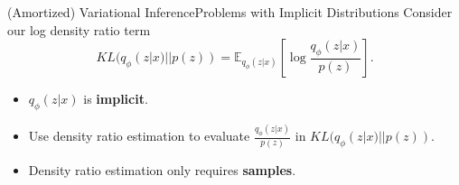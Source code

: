 \documentclass[handout]{beamer}
\newcommand{\E}{\mathbb{E}}
\begin{document}
\begin{frame}{(Amortized) Variational Inference}{Problems with Implicit Distributions}
Consider our log density ratio term
\[KL(q_\phi(z|x)||p(z))=\E_{q_\phi(z|x)}\left[\log \frac{q_\phi(z|x)}{p(z)}\right].\]
\begin{itemize}
\item $q_\phi(z|x)$ is \textbf{implicit}.
\vspace{0.2cm}
\item Use density ratio estimation to evaluate $\frac{q_\phi(z|x)}{p(z)}$ in $KL(q_\phi(z|x)||p(z))$.
\vspace{0.2cm}
\item Density ratio estimation only requires \textbf{samples}.
\end{itemize}
\end{frame}
\end{document}
